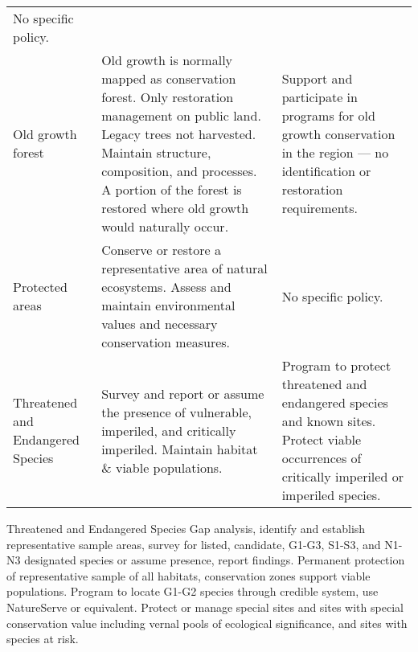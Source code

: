 \begin{longtable}[]{@{}lll@{}}
\begin{minipage}[t]{0.36\columnwidth}
No specific policy.\strut
\end{minipage}\tabularnewline
\begin{minipage}[t]{0.20\columnwidth}\raggedright\strut
Old growth forest\strut
\end{minipage} & \begin{minipage}[t]{0.36\columnwidth}\raggedright\strut
Old growth is normally mapped as conservation forest. Only restoration
management on public land. Legacy trees not harvested. Maintain
structure, composition, and processes. A portion of the forest is
restored where old growth would naturally occur.\strut
\end{minipage} & \begin{minipage}[t]{0.36\columnwidth}\raggedright\strut
Support and participate in programs for old growth conservation in the
region --- no identification or restoration requirements.\strut
\end{minipage}\tabularnewline
\begin{minipage}[t]{0.20\columnwidth}\raggedright\strut
Protected areas\strut
\end{minipage} & \begin{minipage}[t]{0.36\columnwidth}\raggedright\strut
Conserve or restore a representative area of natural ecosystems. Assess
and maintain environmental values and necessary conservation
measures.\strut
\end{minipage} & \begin{minipage}[t]{0.36\columnwidth}\raggedright\strut
No specific policy.\strut
\end{minipage}\tabularnewline
\begin{minipage}[t]{0.20\columnwidth}\raggedright\strut
Threatened and Endangered Species\strut
\end{minipage} & \begin{minipage}[t]{0.36\columnwidth}\raggedright\strut
Survey and report or assume the presence of vulnerable, imperiled, and
critically imperiled. Maintain habitat \& viable populations.\strut
\end{minipage} & \begin{minipage}[t]{0.36\columnwidth}\raggedright\strut
Program to protect threatened and endangered species and known sites.
Protect viable occurrences of critically imperiled or imperiled
species.\strut
\end{minipage}\tabularnewline
\bottomrule
\end{longtable}

\textbar{}Threatened and Endangered Species \textbar{} Gap analysis,
identify and establish representative sample areas, survey for listed,
candidate, G1-G3, S1-S3, and N1-N3 designated species or assume
presence, report findings. Permanent protection of representative sample
of all habitats, conservation zones support viable populations.
\textbar{} Program to locate G1-G2 species through credible system, use
NatureServe or equivalent. Protect or manage special sites and sites
with special conservation value including vernal pools of ecological
significance, and sites with species at risk. \textbar{}

